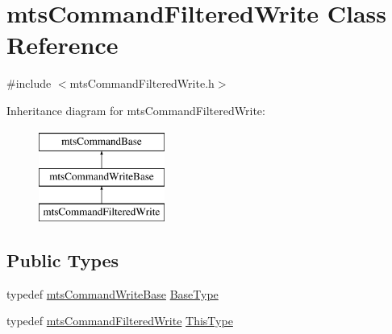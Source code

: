 \hypertarget{classmts_command_filtered_write}{\section{mts\-Command\-Filtered\-Write Class Reference}
\label{classmts_command_filtered_write}
}


{\ttfamily \#include $<$mts\-Command\-Filtered\-Write.\-h$>$}

Inheritance diagram for mts\-Command\-Filtered\-Write\-:\begin{figure}[H]
\begin{center}
\leavevmode
\includegraphics[height=3.000000cm]{d3/d7c/classmts_command_filtered_write}
\end{center}
\end{figure}
\subsection*{Public Types}
\begin{DoxyCompactItemize}
\item 
typedef \hyperlink{classmts_command_write_base}{mts\-Command\-Write\-Base} \hyperlink{classmts_command_filtered_write_af0fe1d0192120a875d65d2ba14f665ef}{Base\-Type}
\item 
typedef \hyperlink{classmts_command_filtered_write}{mts\-Command\-Filtered\-Write} \hyperlink{classmts_command_filtered_write_a397cd5406f1cf05ebdf94ec5050dbe20}{This\-Type}
\end{DoxyCompactItemize}
